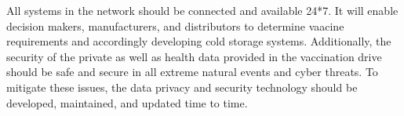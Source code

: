 \documentclass{article}
\begin{document}
All systems in the network should be connected and available 24*7. It will enable decision makers, manufacturers, and distributors to determine vaacine requirements and accordingly developing cold storage systems. Additionally, the security of the private as well as health data provided in the vaccination drive should be safe and secure in all extreme natural events and cyber threats. To mitigate these issues, the data privacy and security technology should be developed, maintained, and updated time to time.  
  




\end{document}
